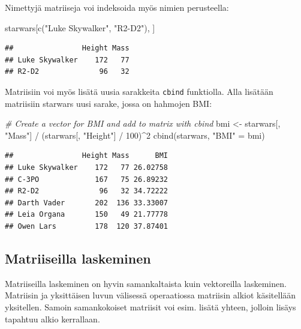 \documentclass[
]{book}
\newenvironment{Shaded}{\begin{snugshade}}{\end{snugshade}}
\newcommand{\CommentTok}[1]{\textcolor[rgb]{0.56,0.35,0.01}{\textit{#1}}}
\newcommand{\DecValTok}[1]{\textcolor[rgb]{0.00,0.00,0.81}{#1}}
\newcommand{\FunctionTok}[1]{\textcolor[rgb]{0.00,0.00,0.00}{#1}}
\newcommand{\NormalTok}[1]{#1}
\newcommand{\OtherTok}[1]{\textcolor[rgb]{0.56,0.35,0.01}{#1}}
\newcommand{\SpecialCharTok}[1]{\textcolor[rgb]{0.00,0.00,0.00}{#1}}
\newcommand{\StringTok}[1]{\textcolor[rgb]{0.31,0.60,0.02}{#1}}
\begin{document}
Nimettyjä matriiseja voi indeksoida myös nimien perusteella:

\begin{Shaded}
\begin{Highlighting}[]
\NormalTok{starwars[}\FunctionTok{c}\NormalTok{(}\StringTok{"Luke Skywalker"}\NormalTok{, }\StringTok{"R2{-}D2"}\NormalTok{), ]}
\end{Highlighting}
\end{Shaded}

\begin{verbatim}
##                Height Mass
## Luke Skywalker    172   77
## R2-D2              96   32
\end{verbatim}

Matriisiin voi myös lisätä uusia sarakkeita \texttt{cbind} funktiolla. Alla lisätään matriisiin starwars uusi sarake, jossa on hahmojen BMI:

\begin{Shaded}
\begin{Highlighting}[]
\CommentTok{\# Create a vector for BMI and add to matrix with cbind}
\NormalTok{bmi }\OtherTok{\textless{}{-}}\NormalTok{ starwars[, }\StringTok{"Mass"}\NormalTok{] }\SpecialCharTok{/}\NormalTok{ (starwars[, }\StringTok{"Height"}\NormalTok{] }\SpecialCharTok{/} \DecValTok{100}\NormalTok{)}\SpecialCharTok{\^{}}\DecValTok{2}
\FunctionTok{cbind}\NormalTok{(starwars, }\StringTok{"BMI"} \OtherTok{=}\NormalTok{ bmi)}
\end{Highlighting}
\end{Shaded}

\begin{verbatim}
##                Height Mass      BMI
## Luke Skywalker    172   77 26.02758
## C-3PO             167   75 26.89232
## R2-D2              96   32 34.72222
## Darth Vader       202  136 33.33007
## Leia Organa       150   49 21.77778
## Owen Lars         178  120 37.87401
\end{verbatim}

\hypertarget{matriiseilla-laskeminen}{%
\subsection{Matriiseilla laskeminen}\label{matriiseilla-laskeminen}}

Matriiseilla laskeminen on hyvin samankaltaista kuin vektoreilla laskeminen. Matriisin ja yksittäisen luvun välisessä operaatiossa matriisin alkiot käsitellään yksitellen. Samoin samankokoiset matriisit voi esim. lisätä yhteen, jolloin lisäys tapahtuu alkio kerrallaan.
\end{document}
